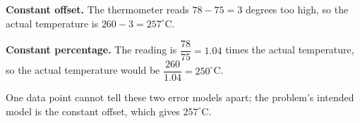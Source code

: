 \textbf{Constant offset.} The thermometer reads $78-75=3$ degrees too high, so the actual temperature is $260-3=\boxed{257^\circ\text{C}}$.

\textbf{Constant percentage.} The reading is $\dfrac{78}{75}=1.04$ times the actual temperature, so the actual temperature would be $\dfrac{260}{1.04}=250^\circ$C.

One data point cannot tell these two error models apart; the problem's intended model is the constant offset, which gives $257^\circ$C.
